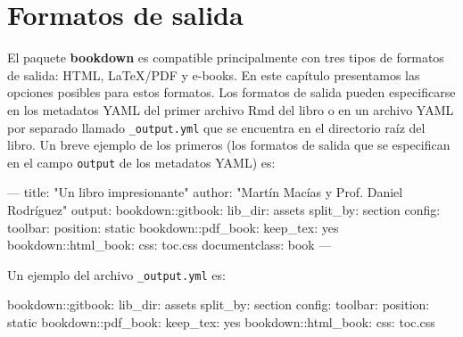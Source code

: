 \documentclass[12pt,]{krantz}
\makeatletter
\newenvironment{Shaded}{\begin{snugshade}}{\end{snugshade}}
\newcommand{\StringTok}[1]{\textcolor[rgb]{0.31,0.60,0.02}{#1}}
\newcommand{\OtherTok}[1]{\textcolor[rgb]{0.56,0.35,0.01}{#1}}
\newcommand{\FunctionTok}[1]{\textcolor[rgb]{0.00,0.00,0.00}{#1}}
\newcommand{\AttributeTok}[1]{\textcolor[rgb]{0.77,0.63,0.00}{#1}}
\newenvironment{kframe}{%
\medskip{}
\setlength{\fboxsep}{.8em}
 \def\at@end@of@kframe{}%
 \ifinner\ifhmode%
  \def\at@end@of@kframe{\end{minipage}}%
  \begin{minipage}{\columnwidth}%
 \fi\fi%
 \def\FrameCommand##1{\hskip\@totalleftmargin \hskip-\fboxsep
 \colorbox{shadecolor}{##1}\hskip-\fboxsep
     \hskip-\linewidth \hskip-\@totalleftmargin \hskip\columnwidth}%
 \MakeFramed {\advance\hsize-\width
   \@totalleftmargin\z@ \linewidth\hsize
   \@setminipage}}%
 {\par\unskip\endMakeFramed%
 \at@end@of@kframe}
\renewenvironment{Shaded}{\begin{kframe}}{\end{kframe}}
\theoremstyle{definition}
\theoremstyle{definition}
\theoremstyle{definition}
\theoremstyle{remark}
\makeatother
\begin{document}
\chapter{Formatos de salida}\label{formatos-de-salida}

El paquete \textbf{bookdown} es compatible principalmente con tres tipos
de formatos de salida: HTML, LaTeX/PDF y e-books. En este capítulo
presentamos las opciones posibles para estos formatos. Los formatos de
salida pueden especificarse en los metadatos YAML del primer archivo Rmd
del libro o en un archivo YAML por separado llamado
\texttt{\_output.yml} que se encuentra en el directorio raíz del libro.
Un breve ejemplo de los primeros (los formatos de salida que se
especifican en el campo \texttt{output} de los metadatos YAML) es:

\begin{Shaded}
\begin{Highlighting}[]
\OtherTok{---}
\FunctionTok{title:}\AttributeTok{ }\StringTok{"Un libro impresionante"}
\FunctionTok{author:}\AttributeTok{ }\StringTok{"Martín Macías y Prof. Daniel Rodríguez"}
\FunctionTok{output:}
  \FunctionTok{bookdown:}\AttributeTok{:gitbook:}
    \FunctionTok{lib_dir:}\AttributeTok{ assets}
    \FunctionTok{split_by:}\AttributeTok{ section}
    \FunctionTok{config:}
      \FunctionTok{toolbar:}
        \FunctionTok{position:}\AttributeTok{ static}
  \FunctionTok{bookdown:}\AttributeTok{:pdf_book:}
    \FunctionTok{keep_tex:}\AttributeTok{ yes}
  \FunctionTok{bookdown:}\AttributeTok{:html_book:}
    \FunctionTok{css:}\AttributeTok{ toc.css}
\FunctionTok{documentclass:}\AttributeTok{ book}
\OtherTok{---}
\end{Highlighting}
\end{Shaded}

Un ejemplo del archivo \texttt{\_output.yml} es:

\begin{Shaded}
\begin{Highlighting}[]
\FunctionTok{bookdown:}\AttributeTok{:gitbook:}
  \FunctionTok{lib_dir:}\AttributeTok{ assets}
  \FunctionTok{split_by:}\AttributeTok{ section}
  \FunctionTok{config:}
    \FunctionTok{toolbar:}
      \FunctionTok{position:}\AttributeTok{ static}
\FunctionTok{bookdown:}\AttributeTok{:pdf_book:}
  \FunctionTok{keep_tex:}\AttributeTok{ yes}
\FunctionTok{bookdown:}\AttributeTok{:html_book:}
  \FunctionTok{css:}\AttributeTok{ toc.css}
\end{Highlighting}
\end{Shaded}
\end{document}
